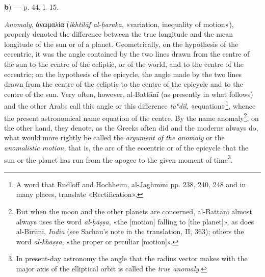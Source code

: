 \documentclass[11pt]{article}
\begin{document}
\par\begin{center}\textbf{b}) — p. 44, l. 15.\end{center}
\par \emph{Anomaly}, {\greekfont ἀνωμαλία} (\emph{ikhtilāf al-ḥaraka}, «variation, inequality of motion»), properly denoted the difference between the true longitude and the mean longitude of the sun or of a planet. Geometrically, on the hypothesis of the eccentric, it was the angle contained by the two lines drawn from the centre of the sun to the centre of the ecliptic, or of the world, and to the centre of the eccentric; on the hypothesis of the epicycle, the angle made by the two lines drawn from the centre of the ecliptic to the centre of the epicycle and to the centre of the sun. Very often, however, al-Battānī (as presently in what follows) and the other Arabs call this angle or this difference \emph{taʿdīl}, «equation»\footnote{A word that Rudloff and Hochheim, al-Jaghmīnī pp. 238, 240, 248 and in many places, translate «Rectification».}, whence the present astronomical name equation of the centre. By the name anomaly\footnote{But when the moon and the other planets are concerned, al-Battānī almost always uses the word  \emph{al-ḥāṣṣa}, «the [motion] falling to [the planet]», as does al-Bīrūnī, \emph{India} (see Sachau's note in the translation, II, 363); others the word  \emph{al-khāṣṣa}, «the proper or peculiar [motion]».}, on the other hand, they denote, as the Greeks often did and the moderns always do, what would more rightly be called the \emph{argument of the anomaly} or the \emph{anomalistic motion}, that is, the arc of the eccentric or of the epicycle that the sun or the planet has run from the apogee to the given moment of time\footnote{In present-day astronomy the angle that the radius vector makes with the major axis of the elliptical orbit is called the \emph{true anomaly}.}.\par
\end{document}
